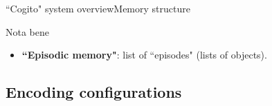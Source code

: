 \begin{frame}{``Cogito" system overview}{Memory structure}
\begin{block}{Nota bene}
\begin{itemize}
\begin{figure}[ht]
\begin{minipage}[t]{0.45\textwidth}
    \\ Graph representation
  \end{minipage}
\end{figure}
\item \textbf{``Episodic memory"}: list of ``episodes" (lists of objects).
\end{itemize}
\end{block}

\end{frame}

\subsection{Encoding configurations}

